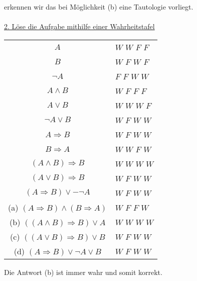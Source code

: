 erkennen wir das bei Möglichkeit (b) eine Tautologie vorliegt.\\
\\
\underline{2. Löse die Aufgabe mithilfe einer Wahrheitstafel}\\
\begin{center}
	\begin{tabular}{cllll}
		\hline
		\multicolumn{1}{c|}{$A$} & \multicolumn{4}{l}{$W$ $W$ $F$ $F$} \\
		\multicolumn{1}{c|}{$B$} & \multicolumn{4}{l}{$W$ $F$ $W$ $F$} \\ 
		\multicolumn{1}{c|}{$\neg A$} & \multicolumn{4}{l}{$F$ $F$ $W$ $W$} \\ 
		\hline
		\multicolumn{1}{c|}{$A \wedge B$} & \multicolumn{4}{l}{$W$ $F$ $F$ $F$} \\
		\multicolumn{1}{c|}{$A \vee B$} & \multicolumn{4}{l}{$W$ $W$ $W$ $F$} \\
		\multicolumn{1}{c|}{$ \neg A \vee B$} & \multicolumn{4}{l}{$W$ $F$ $W$ $W$} \\
		\hline
		\multicolumn{1}{c|}{$ A \Rightarrow B$} & \multicolumn{4}{l}{$W$ $F$ $W$ $W$} \\ 
		\multicolumn{1}{c|}{$ B \Rightarrow A$} & \multicolumn{4}{l}{$W$ $W$ $F$ $W$} \\ 
		\multicolumn{1}{c|}{$ (A \wedge B) \Rightarrow B$} & \multicolumn{4}{l}{$W$ $W$ $W$ $W$} \\ 
		\multicolumn{1}{c|}{$ (A \vee B) \Rightarrow B$} & \multicolumn{4}{l}{$W$ $F$ $W$ $W$} \\ 
		\multicolumn{1}{c|}{$ (A \Rightarrow B) \vee - \neg A$} & \multicolumn{4}{l}{$W$ $F$ $W$ $W$} \\ 
		\hline		
		\multicolumn{1}{c|}{(a) $ (A \Rightarrow B) \wedge (B \Rightarrow A)$} & \multicolumn{4}{l}{$W$ $F$ $F$ $W$} \\
		\multicolumn{1}{c|}{(b) $ ((A \wedge B) \Rightarrow B) \vee A$} & \multicolumn{4}{l}{$W$ $W$ $W$ $W$} \\
		\multicolumn{1}{c|}{(c) $((A \vee B) \Rightarrow B) \vee B$} & \multicolumn{4}{l}{$W$ $F$ $W$ $W$} \\
		\multicolumn{1}{c|}{(d) $(A \Rightarrow B ) \vee \neg A \vee B$} & \multicolumn{4}{l}{$W$ $F$ $W$ $W$} \\
		\hline
	\end{tabular}
\end{center}
Die Antwort (b) ist immer wahr und somit korrekt.
 

\newpage
